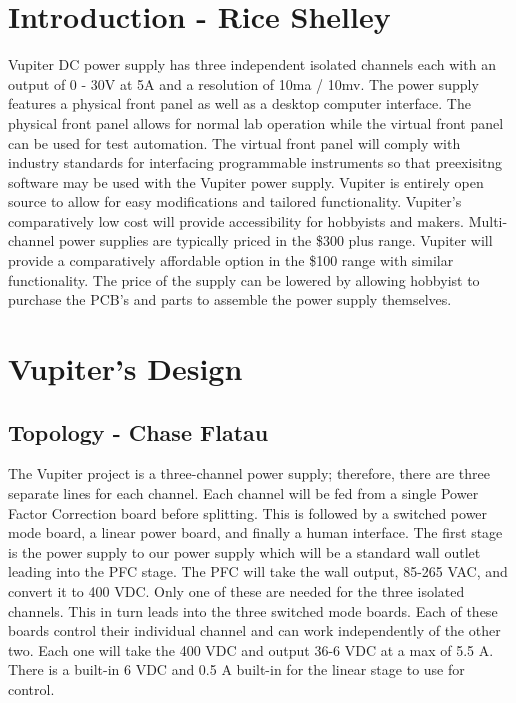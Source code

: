\documentclass[15pt]{article}
\begin{document}
\pagebreak
\tableofcontents
\pagebreak

\section{Introduction - Rice Shelley}
Vupiter DC power supply has three independent isolated channels each with an output of 0 - 30V at 5A and a resolution of 10ma / 10mv. The power supply features a physical front panel as well as a desktop computer interface. The physical front panel allows for normal lab operation while the virtual front panel can be used for test automation. The virtual front panel will comply with industry standards for interfacing programmable instruments so that preexisitng software may be used with the Vupiter power supply. Vupiter is entirely open source to allow for easy modifications and tailored functionality. Vupiter's comparatively low cost will provide accessibility for hobbyists and makers. Multi-channel power supplies are typically priced in the \$300 plus range. Vupiter will provide a comparatively affordable option in the \$100 range with similar functionality. The price of the supply can be lowered by allowing hobbyist to purchase the PCB’s and parts to assemble the power supply themselves.

\section{Vupiter's Design}
\subsection{Topology - Chase Flatau}
The Vupiter project is a three-channel power supply; therefore, there are three separate lines for each channel. Each channel will be fed from a single Power Factor Correction board before splitting. This is followed by a switched power mode board, a linear power board, and finally a human interface. The first stage is the power supply to our power supply which will be a standard wall outlet leading into the PFC stage. The PFC will take the wall output, 85-265 VAC, and convert it to 400 VDC. Only one of these are needed for the three isolated channels. This in turn leads into the three switched mode boards. Each of these boards control their individual channel and can work independently of the other two. Each one will take the 400 VDC and output 36-6 VDC at a max of 5.5 A. There is a built-in 6 VDC and 0.5 A built-in for the linear stage to use for control.
\end{document}
